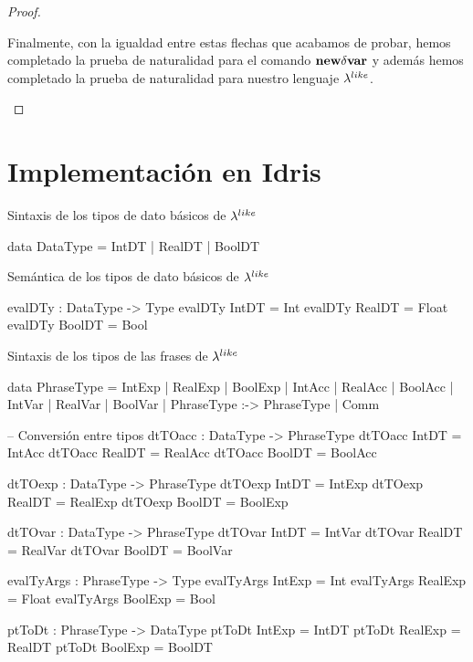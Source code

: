 \begin{proof}
\begin{itemize}
\begin{itemize}
\begin{itemize}
Finalmente, con la igualdad entre estas flechas que acabamos de probar, hemos completado
la prueba de naturalidad para el comando $\textbf{new} \delta \textbf{var}$ y adem\'as hemos completado
la prueba de naturalidad para nuestro lenguaje $\lambda^{like}$.
\end{itemize}
\end{itemize}
\end{itemize}
\end{proof}

\section{Implementaci\'on en Idris}

Sintaxis de los tipos de dato b\'asicos de $\lambda^{like}$

\begin{code}
data DataType = IntDT | RealDT | BoolDT
\end{code}

\noindent Sem\'antica de los tipos de dato b\'asicos de $\lambda^{like}$

\begin{code}
evalDTy : DataType -> Type
evalDTy IntDT  = Int
evalDTy RealDT = Float
evalDTy BoolDT = Bool
\end{code}

\noindent Sintaxis de los tipos de las frases de $\lambda^{like}$
\begin{code}
data PhraseType = IntExp | RealExp | BoolExp 
                | IntAcc | RealAcc | BoolAcc
                | IntVar | RealVar | BoolVar
                | PhraseType :-> PhraseType
                | Comm

-- Conversión entre tipos
dtTOacc : DataType -> PhraseType
dtTOacc IntDT  = IntAcc
dtTOacc RealDT = RealAcc
dtTOacc BoolDT = BoolAcc

dtTOexp : DataType -> PhraseType
dtTOexp IntDT  = IntExp
dtTOexp RealDT = RealExp
dtTOexp BoolDT = BoolExp

dtTOvar : DataType -> PhraseType
dtTOvar IntDT  = IntVar
dtTOvar RealDT = RealVar
dtTOvar BoolDT = BoolVar

evalTyArgs : PhraseType -> Type
evalTyArgs IntExp  = Int
evalTyArgs RealExp = Float
evalTyArgs BoolExp = Bool

ptToDt : PhraseType -> DataType
ptToDt IntExp  = IntDT
ptToDt RealExp = RealDT
ptToDt BoolExp = BoolDT

\end{code}


